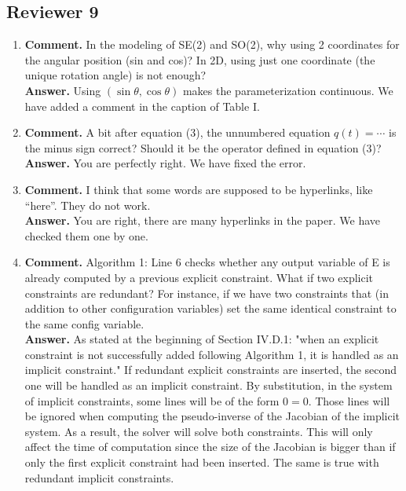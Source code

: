 \documentclass{article}
\begin{document}
\subsection*{Reviewer 9}
\begin{enumerate}
\item \textbf{Comment.} In the modeling of SE(2) and SO(2), why using 2
  coordinates for the angular position (sin and cos)? In 2D, using just one
  coordinate (the unique rotation angle) is not enough?\\
  \textbf{Answer.} Using $(\sin\theta,\cos\theta)$ makes the parameterization
  continuous. We have added a comment in the caption of Table I.

\item \textbf{Comment.} A bit after equation (3), the unnumbered
  equation $q(t)=\cdots$ is the minus sign correct? Should it be the
  operator defined in equation (3)?
  \textbf{Answer.} You are perfectly right. We have fixed the error.

\item \textbf{Comment.} I think that some words are supposed to be
  hyperlinks, like ``here''. They do not work.\\
  \textbf{Answer.} You
  are right, there are many hyperlinks in the paper. We have checked them
  one by one.

\item \textbf{Comment.}  Algorithm 1: Line 6 checks whether any output
  variable of E is already computed by a previous explicit
  constraint. What if two explicit constraints are redundant? For
  instance, if we have two constraints that (in addition to other
  configuration variables) set the same identical constraint to the
  same config variable.  \\
  
  \textbf{Answer.} As stated at the beginning of Section IV.D.1:
  "when an explicit constraint is not successfully added following
  Algorithm 1, it is handled as an implicit constraint." If redundant
  explicit constraints are inserted, the second one will be handled as
  an implicit constraint. By substitution, in the system of implicit
  constraints, some lines will be of the form $0=0$. Those lines will
  be ignored when computing the pseudo-inverse of the Jacobian of the
  implicit system. As a result, the solver will solve both constraints.
  This will only affect the time of computation since the
  size of the Jacobian is bigger than if only the first explicit
  constraint had been inserted. The same is true with redundant
  implicit constraints.


\end{enumerate}
\end{document}
